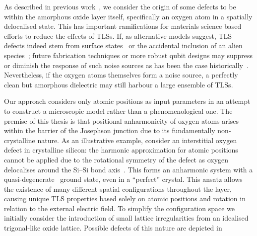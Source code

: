 As described in previous work~\cite{DuBois2013}, we consider the origin of some defects to be within the amorphous oxide layer itself, specifically an oxygen atom in a spatially delocalised state.
This has important ramifications for materials science based efforts to reduce the effects of TLSs.
If, as alternative models suggest, TLS defects indeed stem from surface states~\cite{Choi2009} or the accidental inclusion of an alien species~\cite{Jameson2011, Holder2013}; future fabrication techniques or more robust qubit designs may suppress or diminish the response of such noise sources as has been the case historically~\cite{Vion2002, Martinis2005, Koch2007, Schreier2008, Houck2008}.
Nevertheless, if the oxygen atoms themselves form a noise source, a perfectly clean but amorphous dielectric may still harbour a large ensemble of TLSs.

Our approach considers only atomic positions as input parameters in an attempt to construct a microscopic model rather than a phenomenological one.
The premise of this thesis is that positional anharmonicity of oxygen atoms arises within the  barrier of the Josephson junction due to its fundamentally non-crystalline nature.
As an illustrative example, consider an interstitial oxygen defect in crystalline silicon: the harmonic approximation for atomic positions cannot be applied due to the rotational symmetry of the defect as oxygen delocalises around the Si--Si bond axis~\cite{Artacho1995}.
This forms an anharmonic system with a quasi-degenerate~\cite{DuBois2013} ground state, even in a ``perfect'' crystal.
This ansatz allows the existence of many different spatial configurations throughout the layer, causing unique TLS properties based solely on atomic positions and rotation in relation to the external electric field.
To simplify the configuration space we initially consider the introduction of small lattice irregularities from an idealised trigonal-like  oxide lattice.
Possible defects of this nature are depicted in %


